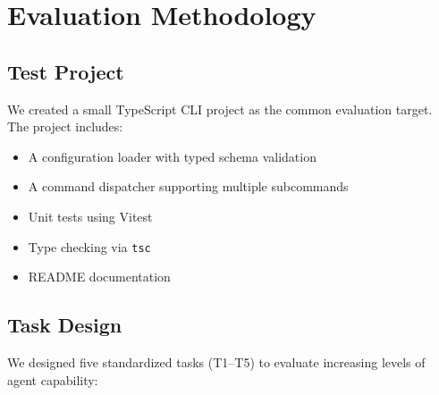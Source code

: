 \documentclass[11pt,a4paper]{article}
\begin{document}
\section{Evaluation Methodology}
\label{sec:method}

\subsection{Test Project}

We created a small TypeScript CLI project as the common evaluation target.
The project includes:
\begin{itemize}
  \item A configuration loader with typed schema validation
  \item A command dispatcher supporting multiple subcommands
  \item Unit tests using Vitest
  \item Type checking via \texttt{tsc}
  \item README documentation
\end{itemize}

\subsection{Task Design}

We designed five standardized tasks (T1--T5) to evaluate increasing levels of agent capability:
\end{document}
